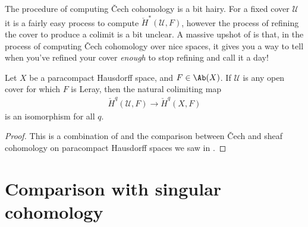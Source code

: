 \documentclass[11pt]{amsart}
\begin{document}
The procedure of computing \v{C}ech cohomology is a bit hairy. For a fixed cover $\mathcal{U}$ it is a fairly easy process to compute $\check{H}^\ast(\mathcal{U},F)$, however the process of refining the cover to produce a colimit is a bit unclear. A massive upshot of  is that, in the process of computing \v{C}ech cohomology over nice spaces, it gives you a way to tell when you've refined your cover \emph{enough} to stop refining and call it a day!

\begin{corollary}\label{cor:leray-covers-paracompact-spaces} Let $X$ be a paracompact Hausdorff space, and $F\in \Ab(X)$. If $\mathcal{U}$ is any open cover for which $F$ is Leray, then the natural colimiting map
\begin{align*}
    \check{H}^q(\mathcal{U},F) \to \check{H}^q(X,F)
\end{align*}
is an isomorphism for all $q$.
\end{corollary}
\begin{proof} This is a combination of  and the comparison between \v{C}ech and sheaf cohomology on paracompact Hausdorff spaces we saw in .
\end{proof}

\section{Comparison with singular cohomology}
\end{document}
